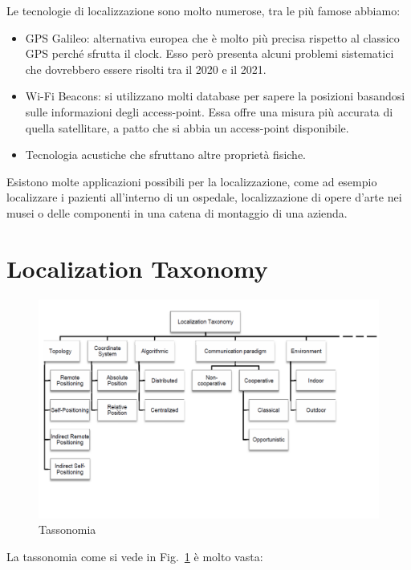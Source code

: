 Le tecnologie di localizzazione sono molto numerose, tra le più famose abbiamo:
\begin{itemize}
    \item GPS Galileo: alternativa europea che è molto più precisa
        rispetto al classico GPS perché sfrutta il clock. Esso però presenta alcuni
        problemi sistematici che dovrebbero essere risolti tra il 2020 e il 2021.
    \item Wi-Fi Beacons: si utilizzano molti database per sapere la
        posizioni basandosi sulle informazioni degli access-point. Essa offre una misura
        più accurata di quella satellitare, a patto che si abbia un access-point
        disponibile.
    \item Tecnologia acustiche che sfruttano altre proprietà
        fisiche.
\end{itemize}

Esistono molte applicazioni possibili per la localizzazione, come ad
esempio localizzare i pazienti all'interno di un ospedale, localizzazione di
opere d'arte nei musei o delle componenti in una catena di montaggio di una
azienda.

\section{Localization Taxonomy}\label{subsec3.3}
\begin{figure}
    \centering
    \includegraphics[scale=0.5]{fig1-lec3pt1.png}
    \caption{Tassonomia}
    \label{fig:fig1-lec3pt1}
\end{figure}

La tassonomia come si vede in Fig.~\ref{fig:fig1-lec3pt1} è molto vasta:

